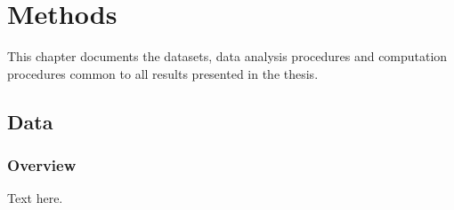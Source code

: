 
\chapter{Methods}\label{c:methods}


\begin{synopsis}
This chapter documents the datasets, data analysis procedures and computation procedures common to all results presented in the thesis.
\end{synopsis}

\section{Data}\label{s:data}


\subsection{Overview}
Text here.

